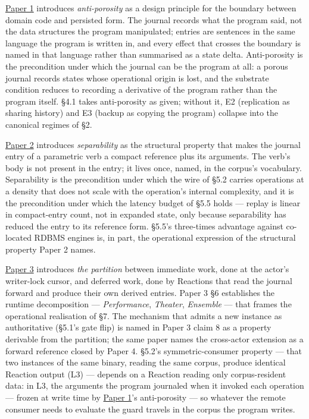 \documentclass[
]{article}
\begin{document}
\href{01-anti-porosity.md}{Paper 1} introduces \emph{anti-porosity} as a
design principle for the boundary between domain code and persisted
form. The journal records what the program said, not the data structures
the program manipulated; entries are sentences in the same language the
program is written in, and every effect that crosses the boundary is
named in that language rather than summarised as a state delta.
Anti-porosity is the precondition under which the journal can be the
program at all: a porous journal records states whose operational origin
is lost, and the substrate condition reduces to recording a derivative
of the program rather than the program itself. §4.1 takes anti-porosity
as given; without it, E2 (replication as sharing history) and E3 (backup
as copying the program) collapse into the canonical regimes of §2.

\href{02-program-value-separability.md}{Paper 2} introduces
\emph{separability} as the structural property that makes the journal
entry of a parametric verb a compact reference plus its arguments. The
verb's body is not present in the entry; it lives once, named, in the
corpus's vocabulary. Separability is the precondition under which the
wire of §5.2 carries operations at a density that does not scale with
the operation's internal complexity, and it is the precondition under
which the latency budget of §5.5 holds --- replay is linear in
compact-entry count, not in expanded state, only because separability
has reduced the entry to its reference form. §5.5's three-times
advantage against co-located RDBMS engines is, in part, the operational
expression of the structural property Paper 2 names.

\href{03-reactions-and-partition.md}{Paper 3} introduces \emph{the
partition} between immediate work, done at the actor's writer-lock
cursor, and deferred work, done by Reactions that read the journal
forward and produce their own derived entries. Paper 3 §6 establishes
the runtime decomposition --- \emph{Performance}, \emph{Theater},
\emph{Ensemble} --- that frames the operational realisation of §7. The
mechanism that admits a new instance as authoritative (§5.1's gate flip)
is named in Paper 3 claim 8 as a property derivable from the partition;
the same paper names the cross-actor extension as a forward reference
closed by Paper 4. §5.2's symmetric-consumer property --- that two
instances of the same binary, reading the same corpus, produce identical
Reaction output (L3) --- depends on a Reaction reading only
corpus-resident data: in L3, the arguments the program journaled when it
invoked each operation --- frozen at write time by
\href{01-anti-porosity.md}{Paper 1}'s anti-porosity --- so whatever the
remote consumer needs to evaluate the guard travels in the corpus the
program writes.
\end{document}
